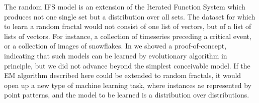 \documentclass[10pt,a4paper,oneside]{article}
\theoremstyle{definition}
\begin{document}
The random IFS model is an extension of the Iterated Function System which produces not one single set but a distribution over all sets. The dataset for which to learn a random fractal would not consist of one list of vectors, but of a list of lists of vectors. For instance, a collection of timeseries preceding a critical event, or a collection of images of snowflakes. In \cite{bloem2010fractal} we showed a proof-of-concept, indicating that such models can be learned by evolutionary algorithm in principle, but we did not advance beyond the simplest conceivable model. If the EM algorithm described here could be extended to random fractals, it would open up a new type of machine learning task, where instances ae represented by point patterns, and the model to be learned is a distribution over distributions.  



\end{document}
